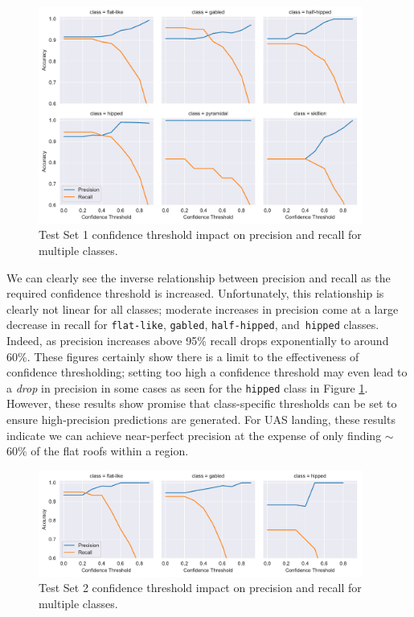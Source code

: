 \begin{figure}[h]
\centering
\includegraphics[width=0.95\textwidth]{chapter_4_roofshape/imgs/metrics_threshold_collapseflat.pdf}
\caption[Test Set 1 confidence thresholding]{Test Set 1 confidence threshold impact on precision and recall for multiple classes.}
\label{fig:confidence_combined_collapseflat}
\end{figure}

We can clearly see the inverse relationship between precision and recall as the required confidence threshold is increased. Unfortunately, this relationship is clearly not linear for all classes; moderate increases in precision come at a large decrease in recall for \texttt{flat-like}, \texttt{gabled}, \texttt{half-hipped}, and~\texttt{hipped} classes. Indeed, as precision increases above 95\% recall drops exponentially to around 60\%.  These figures certainly show there is a limit to the effectiveness of confidence thresholding; setting too high a confidence threshold may even lead to a \emph{drop} in precision in some cases as seen for the \texttt{hipped} class in Figure \ref{fig:confidence_combined_collapseflat}. However, these results show promise that class-specific thresholds can be set to ensure high-precision predictions are generated.  For UAS landing, these results indicate we can achieve near-perfect precision at the expense of only finding $\sim$60\% of the flat roofs within a region.

\begin{figure}[h]
\centering
\includegraphics[width=0.95\textwidth]{chapter_4_roofshape/imgs/metrics_threshold_collapseflat_aa.pdf}
\caption[Test Set 2 confidence thresholding]{Test Set 2 confidence threshold impact on precision and recall for multiple classes.}
\label{fig:confidence_aa_collapseflat}
\end{figure}


